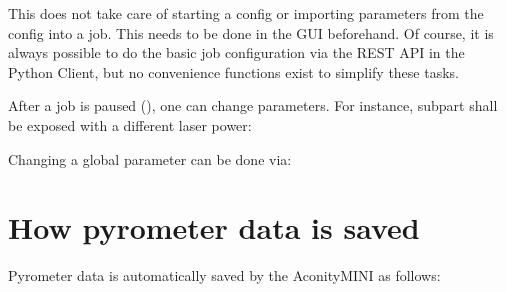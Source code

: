 \documentclass[letterpaper,10pt,english,openany,oneside]{sphinxmanual}
\begin{document}
This does not take care of starting a config or importing parameters from the
config into a job. This needs to be done in the GUI beforehand. Of course, it is
always possible to do the basic job configuration via the REST API in the Python
Client, but no convenience functions exist to simplify these tasks.

After a job is paused (), one can change parameters.
For instance, subpart  shall be exposed with a different laser power:

\begin{sphinxVerbatim}[commandchars=\\\{\}]
   
  
  
   
\end{sphinxVerbatim}

Changing a global parameter can be done via:

\begin{sphinxVerbatim}[commandchars=\\\{\}]
  
  
  
\end{sphinxVerbatim}


\section{How pyrometer data is saved}
\label{\detokenize{aconityapi:how-pyrometer-data-is-saved}}
Pyrometer data is automatically saved by the AconityMINI as follows:
\end{document}
